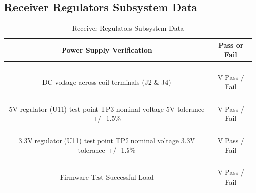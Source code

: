 \documentclass[12pt]{article}
\begin{document}
\subsection{Receiver Regulators Subsystem Data}

\begin{table}[h!]
\centering
\caption*{Receiver Regulators Subsystem Data}
\begin{tabular}{ | c | c | }
\hline
\textbf{Power Supply Verification} & \textbf{Pass or Fail} \\
\hline
\parbox{0.5\linewidth}{\raggedright \hfill \\[-0.25 em]
DC voltage across coil terminals (J2 \& J4)
 \hfill \\[0.1 em]} &  \parbox{0.4\linewidth}{\raggedright \hfill \\ [0.7 em]
\underline{\hspace{0.625in}} V  \hspace{0.125 in}Pass \space / \space  Fail \hfill \\ [0.3 em]
} \\
\hline
\parbox{0.5\linewidth}{\raggedright \hfill \\[-0.25 em]
5V regulator (U11) test point TP3 nominal voltage 5V  tolerance +/- 1.5\%
\hfill \\[0.1 em]} &  \parbox{0.4\linewidth}{\raggedright \hfill \\ [0.7 em]
\underline{\hspace{0.625in}} V  \hspace{0.125 in}Pass \space / \space  Fail \hfill \\ [0.3 em]
} \\
\hline
\parbox{0.5\linewidth}{\raggedright \hfill \\[-0.25 em]
3.3V regulator (U11) test point TP2 nominal voltage 3.3V  tolerance +/- 1.5\%
\hfill \\[0.1 em]} &  \parbox{0.4\linewidth}{\raggedright \hfill \\ [0.7 em]
\underline{\hspace{0.625in}} V  \hspace{0.125 in}Pass \space / \space  Fail \hfill \\ [0.3 em]
} \\ 
\hline
\parbox{0.5\linewidth}{\raggedright \hfill \\[-0.25 em]
Firmware Test Successful Load
\hfill \\[0.1 em]} &  \parbox{0.4\linewidth}{\raggedright \hfill \\ [0.7 em]
\underline{\hspace{0.625in}} V  \hspace{0.125 in}Pass \space / \space  Fail \hfill \\ [0.3 em]
} \\ 
\hline
\end{tabular}
\end{table}
\hfill \\
\pagebreak
\end{document}
